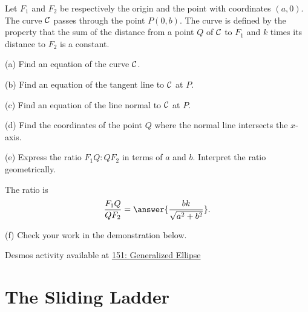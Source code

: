 \documentclass{ximera}
\begin{document}
\begin{question}  \label{Q:JDJHDHD}
Let $F_1$ and $F_2$ be respectively the origin and the point with coordinates $(a,0)$. The curve ${\cal C}$ passes through the point $P(0,b)$. The curve is defined by the property that the sum of the distance from a point $Q$ of ${\cal C}$ to $F_1$ and $k$ times its distance to $F_2$ is a constant.

(a) Find an equation of the curve ${\cal C}$.

(b) Find an equation of the tangent line to ${\cal C}$ at $P$.

(c) Find an equation of the line normal to ${\cal C}$ at $P$.

(d) Find the coordinates of the point $Q$ where the normal line intersects the $x$-axis.

(e) Express the ratio $F_1 Q : Q F_2$ in terms of $a$ and $b$. Interpret the ratio geometrically.

The ratio is
\[
    \frac{F_1 Q}{Q F_2} = \answer{\frac{bk}{\sqrt{a^2+b^2}}} . 
\]

(f) Check your work in the demonstration below.

\begin{onlineOnly}
    \begin{center}
\end{center}
\end{onlineOnly}

Desmos activity available at \href{https://www.desmos.com/calculator/uz7w5uh0vl}{151: Generalized Ellipse}

\end{question}


\section*{The Sliding Ladder}
\end{document}
